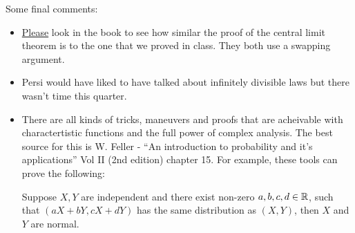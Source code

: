 \begin{remark}
    Some final comments:
    \begin{itemize}
        \item \underline{Please} look in the book to see how similar the proof of the central limit theorem is to the one that we proved in class. They both use a swapping argument.
        \item Persi would have liked to have talked about infinitely divisible laws but there wasn't time this quarter.
        \item There are all kinds of tricks, maneuvers and proofs that are acheivable with charactertistic functions and the full power of complex analysis. The best source for this is W. Feller - ``An introduction to probability and it's applications'' Vol II (2nd edition) chapter 15. For example, these tools can prove the following:
        \begin{thrm}
            Suppose $X,Y$ are independent and there exist non-zero $a,b,c,d\in {\mathbb R}$, such that $(aX+bY, cX+dY)$ has the same distribution as $(X,Y)$, then $X$ and $Y$ are normal.
        \end{thrm}
    \end{itemize}
    
\end{remark}



